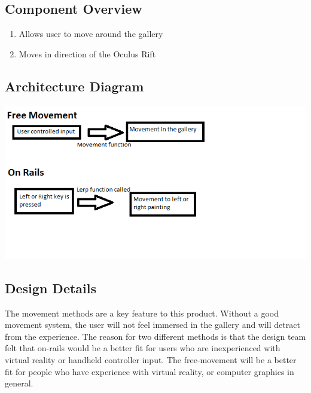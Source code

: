 \subsection{Component  Overview}
\begin{enumerate}
	\item Allows user to move around the gallery
	\item Moves in direction of the Oculus Rift
\end{enumerate}


\subsection{ Architecture  Diagram}
\includegraphics[scale=1.0]{Diagrams/MovementDiagram.png}




\subsection{Design Details}
The movement methods are a key feature to this product.  Without a good movement system, the user will not feel immersed in the gallery and will detract from the experience.  The reason for two different methods is that the design team felt that on-rails would be a better fit for users who are inexperienced with virtual reality or handheld controller input.  The free-movement will be a better fit for people who have experience with virtual reality, or computer graphics in general.

